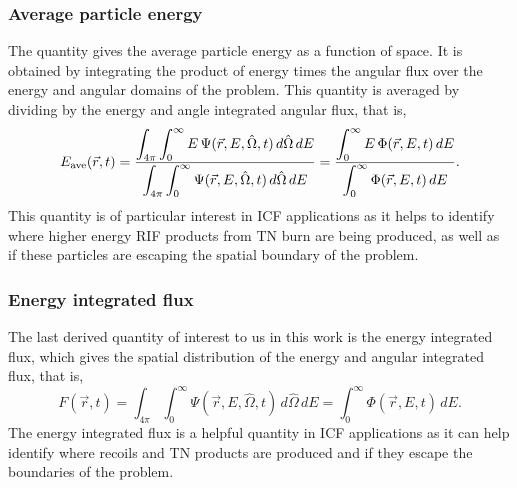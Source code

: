 \subsubsection{Average particle energy}
The quantity gives the average particle energy as a function of space. It is obtained by integrating the product of energy times the angular flux over the energy and angular domains of the problem. This quantity is averaged by dividing by the energy and angle integrated angular flux, that is,
\begin{equation}
  E_{\text{ave}}(\vec{r},t) = \frac{\displaystyle \int_{4\pi} \int_{0}^{\infty} E \, \Psi(\vec{r},E,\hat{\Omega},t) \, d \hat{\Omega} \, dE}{\displaystyle  \int_{4\pi} \int_{0}^{\infty} \Psi(\vec{r},E,\hat{\Omega},t) \, d \hat{\Omega} \, dE} = \frac{\displaystyle \int_{0}^{\infty} E \, \Phi(\vec{r},E,t) \, dE}{\displaystyle  \int_{0}^{\infty} \Phi(\vec{r},E,t) \, dE}.
\end{equation}
This quantity is of particular interest in ICF applications as it helps to identify where higher energy RIF products from TN burn are being produced, as well as if these particles are escaping the spatial boundary of the problem.

\subsubsection{Energy integrated flux}
The last derived quantity of interest to us in this work is the energy integrated flux, which gives the spatial distribution of the energy and angular integrated flux, that is,
\begin{equation}
  F(\vec{r},t) = \int_{4\pi} \int_{0}^{\infty} \Psi(\vec{r},E,\hat{\Omega},t) \, d \hat{\Omega} \, dE = \int_{0}^{\infty} \Phi(\vec{r},E,t) \, dE.
\end{equation}
The energy integrated flux is a helpful quantity in ICF applications as it can help identify where recoils and TN products are produced and if they escape the boundaries of the problem.
